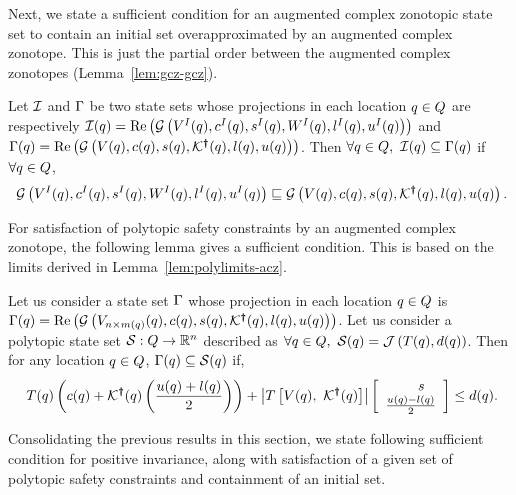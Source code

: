 %
Next, we state a sufficient condition for an augmented complex
zonotopic state set to contain an initial set overapproximated by an
augmented complex zonotope.  This is just the partial order between
the augmented complex zonotopes (Lemma~\ref{lem:gcz-gcz}).
\begin{lemma}
  Let $\mathcal{I}$ and $\Gamma$ be two state sets whose projections in
  each location $q\in Q$ are respectively
  $\mathcal{I}(q)=\operatorname{\operatorname{Re}}\left(\mathcal{G}\left(V^I(q),c^I(q),s^I(q),W^I(q),l^I(q),u^I(q)\right)\right)$
  and $\Gamma(q) =
  \operatorname{\operatorname{Re}}\left(\mathcal{G}\left(V(q),c(q),s(q),\mathcal{K}^{\bm{\dagger}}(q),l(q),u(q)\right)\right)$.
  Then $\forall q\in Q,~\mathcal{I}(q)\subseteq
  \Gamma(q)$ if $\forall q\in Q$,
\begin{align}~\label{eqn:initcont}
\mathcal{G}\left(V^I(q),c^I(q),s^I(q),W^I(q),l^I(q),u^I(q)\right)\sqsubseteq\mathcal{G}\left(V(q),c(q),s(q),\mathcal{K}^{\bm{\dagger}}(q),l(q),u(q)\right).
\end{align}
\end{lemma}
%
For satisfaction of polytopic safety constraints by an augmented
complex zonotope, the following lemma gives a sufficient condition.
This is based on the limits derived in Lemma~\ref{lem:polylimits-acz}.
%
\begin{lemma}
  Let us consider a state set $\Gamma$ whose projection in each
  location $q \in Q$ is $\Gamma(q) =
  \operatorname{\operatorname{Re}}\left(\mathcal{G}\left(V_{n\times
      m(q)}(q),c(q),s(q),\mathcal{K}^{\bm{\dagger}}(q),l(q),u(q)\right)\right)$.
  Let us consider a polytopic state set
  $\mathcal{S}:Q\rightarrow\mathbb{R}^n$ described as $\forall
  q\in Q,~\mathcal{S}(q)=\mathcal{J}\left(T(q),d(q)\right)$. Then
  for any location $q\in Q$, $\Gamma(q)\subseteq
  \mathcal{S}(q)$ if,
\begin{align}~\label{eqn:safecont}
T(q)\left(c(q)+\mathcal{K}^{\bm{\dagger}}(q)\left(\frac{u(q)+l(q)}{2}\right)\right)+\left|T\left[V(q),~\mathcal{K}^{\bm{\dagger}}(q)\right]\right|\left[\begin{array}{c}{\hspace{1.5em}s}\\{\frac{u(q)-l(q)}{2}} \end{array}\right]\leq d(q).
\end{align}
\end{lemma}
%
Consolidating the previous results in this section, we state following
sufficient condition for positive invariance, along with satisfaction
of a given set of polytopic safety constraints and containment of an initial set.
%
